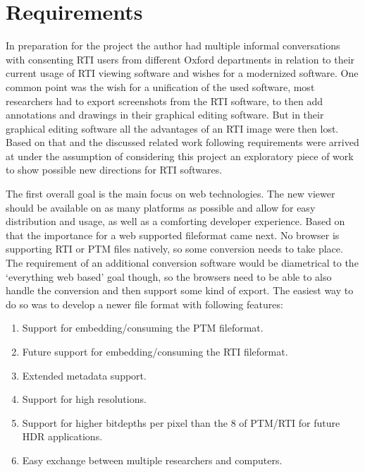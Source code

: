 \section{Requirements}
In preparation for the project the author had multiple informal conversations
with consenting RTI users from different Oxford departments in relation to their
current usage of RTI viewing software and wishes for a modernized software. One
common point was the wish for a unification of the used software, most
researchers had to export screenshots from the RTI software, to then add
annotations and drawings in their graphical editing software. But in their
graphical editing software all the advantages of an RTI image were then lost.
Based on that and the discussed related work following requirements were arrived
at under the assumption of considering this project an exploratory piece of work
to show possible new directions for RTI softwares.

The first overall goal is the main focus on web technologies. The new viewer
should be available on as many platforms as possible and allow for easy
distribution and usage, as well as a comforting developer experience. Based on
that the importance for a web supported fileformat came next. No browser is supporting
RTI or PTM files natively,  so some conversion needs to take place. The
requirement of an additional conversion software would be diametrical to the
`everything web based' goal though, so the browsers need to be able to also
handle the conversion and then support some kind of export. The easiest way to
do so was to develop a newer file format with following features:

\begin{enumerate}
\item Support for embedding/consuming the PTM\cite*{library_of_congress_polynomial_2018}  fileformat.
\item Future support for embedding/consuming the RTI\cite*{library_of_congress_reflectance_2018} fileformat.
\item Extended metadata support.
\item Support for high resolutions.
\item Support for higher bitdepths per pixel than the 8 of PTM/RTI for future
  HDR applications.
\item Easy exchange between multiple researchers and computers.
\end{enumerate}

